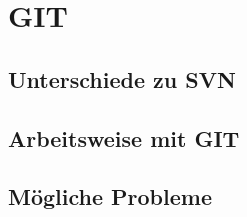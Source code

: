 ﻿\section{GIT}

\subsection{Unterschiede zu SVN}

\subsection{Arbeitsweise mit GIT}

\subsection{Mögliche Probleme}

